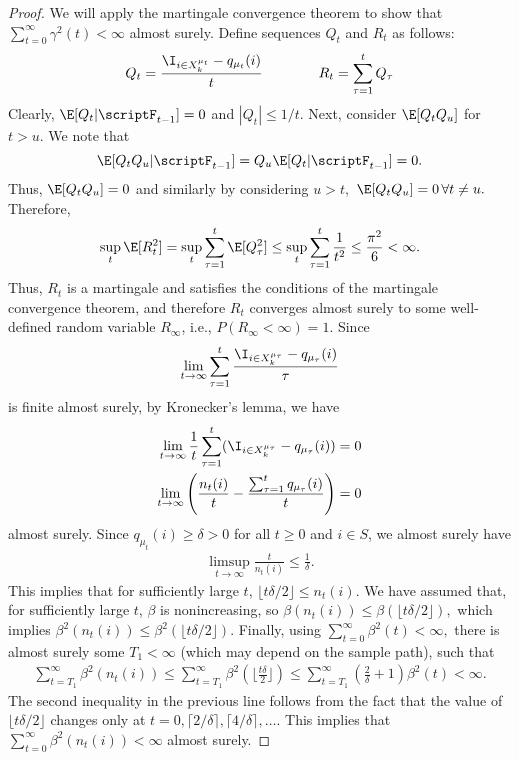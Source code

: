 \documentclass[12pt]{article}
\begin{document}
\begin{proof}
We will apply the martingale convergence theorem to show that $\sum_{t=0}^\infty \gamma^2(t) < \infty$ almost surely. Define sequences $Q_t$ and $R_t$ as follows:
\begin{equation*}
    Q_t = \frac{\I_{i \in X_k^{\mu_t}} - q_{\mu_t}(i)}{t} \qquad\qquad R_t = \sum_{\tau = 1}^t Q_\tau
\end{equation*}
Clearly, $\E[Q_t | \scriptF_{t-1}] = 0$ and $|Q_t| \leq 1/t.$ Next, consider $\E[Q_tQ_u]$ for $t > u.$ We note that
$$\E[Q_tQ_u|\scriptF_{t-1}]=Q_u\E[Q_t|\scriptF_{t-1}]=0.$$ Thus, $\E[Q_t Q_u]=0$ and similarly by considering $u>t,$ $\E[Q_tQ_u]=0 \,\forall t\neq u.$ Therefore,
$$\sup_t \E[R^2_t] =\sup_t \sum_{\tau=1}^t \E[Q_\tau^2]\leq \sup_t \sum_{\tau=1}^t\frac{1}{t^2}\leq \frac{\pi^2}{6} < \infty.$$ Thus, $R_t$ is a martingale and satisfies the conditions of the martingale convergence theorem, and therefore $R_t$ converges almost surely to some well-defined random variable $R_\infty$, i.e., $P(R_\infty<\infty)=1.$ Since 
\begin{equation*}
\lim_{t \to \infty} \sum_{\tau=1}^t \frac{\I_{i \in X_k^{\mu_\tau}} - q_{\mu_\tau}(i)}{\tau}
\end{equation*}
is finite almost surely, by Kronecker's lemma, we have
\begin{align*}
    \lim_{t\to\infty} \frac{1}{t} \sum_{\tau=1}^t (\I_{i \in X_k^{\mu_\tau}} - q_{\mu_\tau}(i)) &= 0\\
    \lim_{t\to\infty} \left(\frac{n_t(i)}{t} - \frac{\sum_{\tau=1}^t q_{\mu_\tau}(i)}{t} \right) &= 0
\end{align*}
almost surely. Since $q_{\mu_t}(i) \geq \delta > 0$ for all $t\geq 0$ and $i \in S$, we almost surely have
\begin{align*}
    \limsup_{t\to\infty} \frac{t}{n_t(i)} \leq \frac{1}{\delta}.
\end{align*}
This implies that for sufficiently large $t$, $\lfloor t\delta/2 \rfloor \leq n_t(i)$. We have assumed that, for sufficiently large $t$, $\beta$ is nonincreasing, so $\beta(n_t(i))\leq \beta(\lfloor t\delta/2 \rfloor),$ which implies $\beta^2(n_t(i))\leq \beta^2(\lfloor t\delta/2 \rfloor).$ Finally, using $\sum_{t=0}^\infty \beta^2(t) < \infty,$ there is almost surely some $T_1 < \infty$ (which may depend on the sample path), such that
\begin{align*}
\sum_{t=T_1}^\infty \beta^2(n_t(i)) \leq \sum_{t=T_1}^\infty \beta^2(\lfloor \frac{t\delta}{2} \rfloor) \leq \sum_{t=T_1}^\infty (\frac{2}{\delta}+1) \beta^2(t) < \infty. 
\end{align*}
The second inequality in the previous line follows from the fact that the value of $\lfloor t\delta/2\rfloor$ changes only at $t=0,\lceil 2/\delta \rceil, \lceil 4/\delta \rceil, \ldots$. This implies that $\sum_{t=0}^\infty \beta^2(n_t(i)) < \infty$ almost surely.
\end{proof} 
\end{document}
